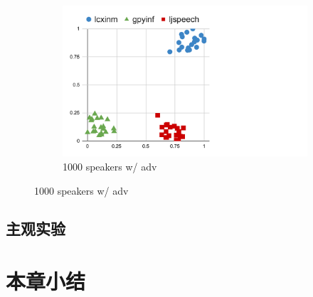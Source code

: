 \begin{figure}[!ht]
\begin{minipage}[b]{\linewidth}
\begin{subfigure}[b]{0.33\linewidth}
            \includegraphics[width=\linewidth,trim=0 0 200 0,clip]{figure/5_dvector23.pdf}
            \caption{1000 speakers w/ adv}
        \end{subfigure}   
    \end{minipage}

\end{figure}

\subsection{主观实验}

\section{本章小结}